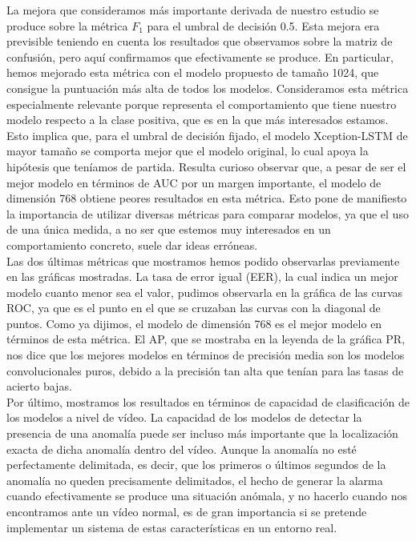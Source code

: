 \documentclass[../main.tex]{memoir}
\begin{document}
La mejora que consideramos más importante derivada de nuestro estudio
se produce sobre la métrica $F_1$ para el umbral de decisión 0.5. Esta
mejora era previsible teniendo en cuenta los resultados que observamos
sobre la matriz de confusión, pero aquí confirmamos que efectivamente
se produce. En particular, hemos mejorado esta métrica con el modelo
propuesto de tamaño 1024, que consigue la puntuación más alta de todos
los modelos. Consideramos esta métrica especialmente relevante porque
representa el comportamiento que tiene nuestro modelo respecto a la
clase positiva, que es en la que más interesados estamos. Esto implica
que, para el umbral de decisión fijado, el modelo Xception-LSTM de
mayor tamaño se comporta mejor que el modelo original, lo cual apoya
la hipótesis que teníamos de partida. Resulta curioso observar que, a
pesar de ser el mejor modelo en términos de AUC por un margen
importante, el modelo de dimensión 768 obtiene peores resultados
en esta métrica. Esto pone de manifiesto la importancia de utilizar
diversas métricas para comparar modelos, ya que el uso de una única
medida, a no ser que estemos muy
interesados en un comportamiento concreto, suele dar ideas erróneas.\\

Las dos últimas métricas que mostramos hemos podido observarlas
previamente en las gráficas mostradas. La tasa de error igual (EER),
la cual indica un mejor modelo cuanto menor sea el valor, pudimos
observarla en la gráfica de las curvas ROC, ya que es el punto en el
que se cruzaban las curvas con la diagonal de puntos. Como ya dijimos,
el modelo de dimensión 768 es el mejor modelo en términos de esta
métrica. El AP, que se mostraba en la leyenda de la gráfica PR, nos
dice que los mejores modelos en términos de precisión media son los
modelos convolucionales puros, debido a la precisión tan alta que
tenían para las tasas de acierto bajas.\\

Por último, mostramos los resultados en términos de capacidad de
clasificación de los modelos a nivel de vídeo. La capacidad de los
modelos de detectar la presencia de una anomalía puede ser incluso más
importante que la localización exacta de dicha anomalía dentro del
vídeo. Aunque la anomalía no esté perfectamente delimitada, es decir,
que los primeros o últimos segundos de la anomalía no queden
precisamente delimitados, el hecho de generar la alarma cuando
efectivamente se produce una situación anómala, y no hacerlo cuando
nos encontramos ante un vídeo normal, es de gran importancia si se
pretende implementar un sistema de estas características en un
entorno real.\\
\end{document}
